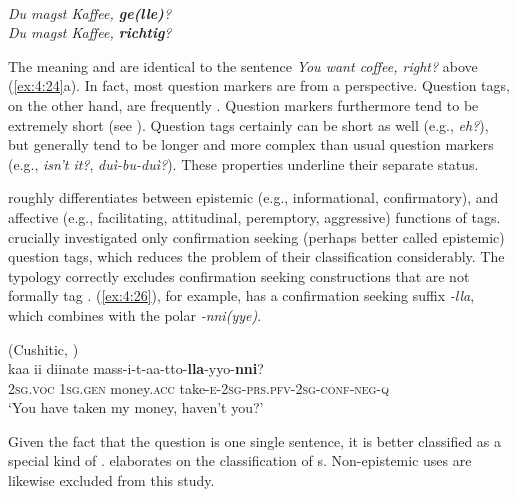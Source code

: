 \newpage 
\ea%
    \label{ex:4:25}
    \\
    \ea
      \textit{Du magst Kaffee, \textbf{ge(lle)}?}\\
    
    \ex
      \textit{Du magst Kaffee, \textbf{richtig}?}\\
    \z
    \z

\noindent The meaning and  are identical to the  sentence \textit{You want coffee, right?} above (\ref{ex:4:24}a). In fact, most question markers are  from a  perspective. Question tags, on the other hand, are frequently . Question markers furthermore tend to be extremely short (see ). Question tags certainly can be short as well (e.g.,  \textit{eh?}), but generally tend to be longer and more complex than usual question markers (e.g.,  \textit{isn’t it?},  \textit{duì-bu-duì?}). These properties underline their separate status.

\citet[2167]{Mithun2012} roughly differentiates between epistemic (e.g., informational, confirmatory), and affective (e.g., facilitating, attitudinal, peremptory, aggressive) functions of tags. \citet{Axelsson2011} crucially investigated only confirmation seeking (perhaps better called epistemic) question tags, which reduces the problem of their classification considerably. The typology correctly excludes confirmation seeking constructions that are not formally tag  \citep[796]{Axelsson2011}.  (\ref{ex:4:26}), for example, has a confirmation seeking suffix \textit{-lla}, which combines with the polar  \textit{-nni(yye)}.

\ea%
    \label{ex:4:26}
     (Cushitic, )\\
    \gll kaa    ii    diinate    mass-i-t-aa-tto-\textbf{{lla}}{-yyo-}\textbf{{nni}}?\\
    2\textsc{sg.voc}  1\textsc{sg.gen}  money.\textsc{acc}  take-\textsc{e}-2\textsc{sg}-\textsc{prs.pfv}-2\textsc{sg}-\textsc{conf}-\textsc{neg}-\textsc{q}\\
    \glt ‘You have taken my money, haven’t you?’ \citep[27]{Sulamo2013}
    \z

\noindent Given the fact that the question is one single sentence, it is better classified as a special kind of .  elaborates on the classification of s. Non-epistemic uses are likewise excluded from this study.

